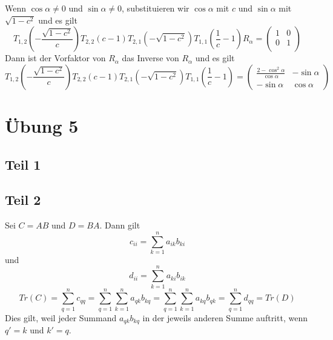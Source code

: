 \documentclass[a4paper,10pt]{article}
\begin{document}
Wenn $\cos \alpha \ne 0$ und $\sin \alpha \ne 0$, substituieren wir $\cos \alpha$ mit $c$ und $\sin \alpha$ mit $\sqrt{1 - c^2}$ und es gilt
\begin{equation}
 T_{1,2}(-\frac{\sqrt{1 - c^2}}{c})T_{2,2}(c - 1)T_{2,1}(-\sqrt{1 - c^2})T_{1,1}(\frac{1}{c} - 1)R_\alpha =
 \begin{pmatrix}
  1 & 0\\
  0 & 1\\
 \end{pmatrix}
\end{equation}
Dann ist der Vorfaktor von $R_\alpha$ das Inverse von $R_\alpha$ und es gilt
\begin{equation}
 T_{1,2}(-\frac{\sqrt{1 - c^2}}{c})T_{2,2}(c - 1)T_{2,1}(-\sqrt{1 - c^2})T_{1,1}(\frac{1}{c} - 1) = 
 \begin{pmatrix}
  \frac{2 - \cos^2 \alpha}{\cos \alpha} & -\sin \alpha\\
  -\sin \alpha & \cos \alpha
 \end{pmatrix}
\end{equation}


\section*{Übung 5}

\subsection*{Teil 1}

\subsection*{Teil 2}

Sei $C = AB$ und $D = BA$.
Dann gilt
\begin{equation}
 c_{ii} = \sum_{k = 1}^n a_{ik} b_{ki}
\end{equation}
und
\begin{equation}
 d_{ii} = \sum_{k = 1}^n a_{ki} b_{ik}
\end{equation}
\begin{equation}
 Tr(C) = \sum_{q = 1}^n c_{qq} = \sum_{q = 1}^n \sum_{k = 1}^n a_{qk} b_{kq} = \sum_{q = 1}^n \sum_{k = 1}^n a_{kq} b_{qk} = \sum_{q = 1}^n d_{qq} = Tr(D)
\end{equation}
Dies gilt, weil jeder Summand $a_{qk}b_{kq}$ in der jeweils anderen Summe auftritt, wenn $q' = k$ und $k' = q$.
\end{document}
